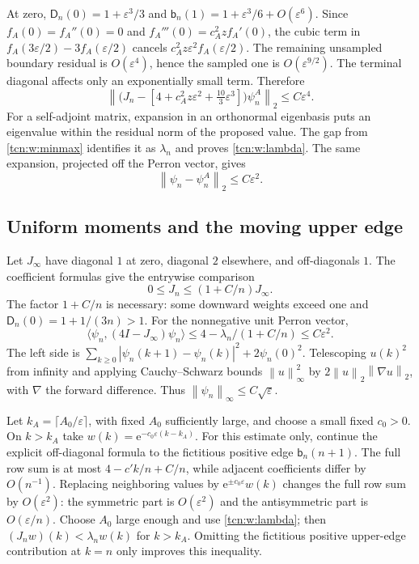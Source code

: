 \documentclass[11pt,letterpaper]{article}
\newcommand{\norm}[1]{\left\lVert#1\right\rVert}
\newcommand{\ip}[2]{\langle#1,#2\rangle}
\newcommand{\eps}{\varepsilon}
\newcommand{\ee}{\mathrm e}
\theoremstyle{remark}
\begin{document}
At zero, $\mathsf D_n(0)=1+\eps^3/3$ and $\mathsf b_n(1)=1+\eps^3/6+O(\eps^6)$. Since
$f_A(0)=f_A''(0)=0$ and $f_A'''(0)=c_A^2zf_A'(0)$, the cubic term in
$f_A(3\eps/2)-3f_A(\eps/2)$ cancels $c_A^2z\eps^2f_A(\eps/2)$. The remaining unsampled boundary residual is $O(\eps^4)$, hence the sampled one is $O(\eps^{9/2})$. The terminal diagonal affects only an exponentially small term. Therefore
\begin{equation}\label{tcn:w:residual}
 \norm{\bigl(J_n-[4+c_A^2z\eps^2+\tfrac{10}{3}\eps^3]\bigr)\psi^A_n}_2
                  \le C\eps^4.
\end{equation}
For a self-adjoint matrix, expansion in an orthonormal eigenbasis puts an eigenvalue within the residual norm of the proposed value. The gap from \eqref{tcn:w:minmax} identifies it as $\lambda_n$ and proves \eqref{tcn:w:lambda}. The same expansion, projected off the Perron vector, gives
\begin{equation}\label{tcn:w:qclose}
 \norm{\psi_n-\psi^A_n}_2\le C\eps^2.
\end{equation}

\subsection{Uniform moments and the moving upper edge}
Let $J_\infty$ have diagonal $1$ at zero, diagonal $2$ elsewhere, and off-diagonals $1$. The coefficient formulas give the entrywise comparison
\begin{equation}\label{tcn:w:domination}
 0\le J_n\le(1+C/n)J_\infty.
\end{equation}
The factor $1+C/n$ is necessary: some downward weights exceed one and $\mathsf D_n(0)=1+1/(3n)>1$. For the nonnegative unit Perron vector,
\[
 \ip{\psi_n}{(4I-J_\infty)\psi_n}
 \le4-\lambda_n/(1+C/n)\le C\eps^2.
\]
The left side is $\sum_{k\ge0}|\psi_n(k+1)-\psi_n(k)|^2+2\psi_n(0)^2$.
Telescoping $u(k)^2$ from infinity and applying Cauchy--Schwarz bounds $\norm{u}_\infty^2$ by $2\norm{u}_2\norm{\nabla u}_2$, with $\nabla$ the forward difference. Thus
$\norm{\psi_n}_\infty\le C\sqrt\eps$.

Let $k_A=\lceil A_0/\eps\rceil$, with fixed $A_0$ sufficiently large, and choose a small fixed $c_0>0$. On $k>k_A$ take $w(k)=\ee^{-c_0\eps(k-k_A)}$. For this estimate only, continue the explicit off-diagonal formula to the fictitious positive edge $\mathsf b_n(n+1)$. The full row sum is at most $4-c'k/n+C/n$, while adjacent coefficients differ by $O(n^{-1})$. Replacing neighboring values by $\ee^{\pm c_0\eps}w(k)$ changes the full row sum by $O(\eps^2)$: the symmetric part is $O(\eps^2)$ and the antisymmetric part is $O(\eps/n)$. Choose $A_0$ large enough and use \eqref{tcn:w:lambda}; then $(J_nw)(k)<\lambda_nw(k)$ for $k>k_A$. Omitting the fictitious positive upper-edge contribution at $k=n$ only improves this inequality.
\end{document}
